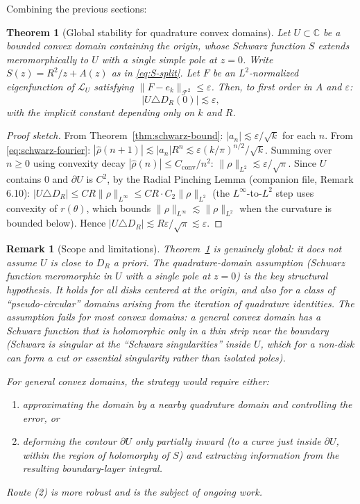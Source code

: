 \documentclass[a4paper,11pt,reqno]{amsart}
\newtheorem{theorem}{Theorem}[section]
\newtheorem{remark}{Remark}[section]
\begin{document}
Combining the previous sections:

\begin{theorem}[Global stability for quadrature convex domains]
\label{thm:global}
Let $U\subset\mathbb{C}$ be a bounded convex domain containing the origin,
whose Schwarz function $S$ extends meromorphically to $U$ with a single
simple pole at $z=0$. Write $S(z)=R^2/z+A(z)$ as in \eqref{eq:S-split}.
Let $F$ be an $L^2$-normalized eigenfunction of $\mathcal{L}_U$ satisfying
$\|F-e_k\|_{\mathcal{F}^2}\le\varepsilon$. Then, to first order in $A$ and $\varepsilon$:
\begin{equation}\label{eq:global-stability}
|U\triangle D_R(0)|\lesssim\varepsilon,
\end{equation}
with the implicit constant depending only on $k$ and $R$.
\end{theorem}

\begin{proof}[Proof sketch]
From Theorem~\ref{thm:schwarz-bound}: $|a_n|\lesssim\varepsilon/\sqrt{k}$ for each $n$.
From \eqref{eq:schwarz-fourier}: $|\hat\rho(n+1)|\lesssim|a_n|R^n\lesssim\varepsilon(k/\pi)^{n/2}/\sqrt{k}$.
Summing over $n\ge0$ using convexity decay $|\hat\rho(n)|\le C_{\mathrm{conv}}/n^2$:
$\|\rho\|_{L^2}\lesssim\varepsilon/\sqrt{\pi}$.
Since $U$ contains $0$ and $\partial U$ is $C^2$, by the Radial Pinching Lemma
(companion file, Remark 6.10):
$|U\triangle D_R|\le C R\|\rho\|_{L^\infty}\le CR\cdot C_2\|\rho\|_{L^2}$
(the $L^\infty$-to-$L^2$ step uses convexity of $r(\theta)$, which bounds
$\|\rho\|_{L^\infty}\lesssim\|\rho\|_{L^2}$ when the curvature is bounded below).
Hence $|U\triangle D_R|\lesssim R\varepsilon/\sqrt{\pi}\lesssim\varepsilon$.
\end{proof}

\begin{remark}[Scope and limitations]
Theorem~\ref{thm:global} is genuinely global: it does not assume $U$ is close
to $D_R$ a priori. The quadrature-domain assumption (Schwarz function
meromorphic in $U$ with a single pole at $z=0$) is the key structural hypothesis.
It holds for all disks centered at the origin, and also for a class of
``pseudo-circular'' domains arising from the iteration of quadrature identities.
The assumption fails for most convex domains: a general convex domain has a
Schwarz function that is holomorphic only in a thin strip near the boundary
(Schwarz is singular at the ``Schwarz singularities'' inside $U$, which for
a non-disk can form a cut or essential singularity rather than isolated poles).

For general convex domains, the strategy would require either:
\begin{enumerate}
\item approximating the domain by a nearby quadrature domain and controlling
  the error, or
\item deforming the contour $\partial U$ only partially inward (to a curve just
  inside $\partial U$, within the region of holomorphy of $S$) and extracting
  information from the resulting boundary-layer integral.
\end{enumerate}
Route (2) is more robust and is the subject of ongoing work.
\end{remark}
\end{document}
